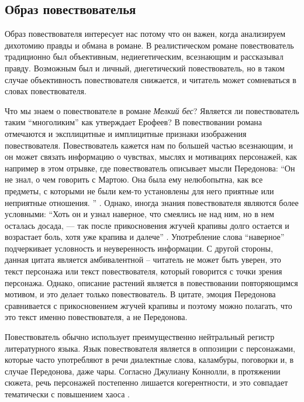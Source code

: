 \documentclass[12pt,a4paper]{article}
\begin{document}

\subsection{Образ повествователья}


Образ повествователя интересует нас потому что он важен, когда анализируем дихотомию правды и обмана в романе. В реалистическом романе повествователь традиционно был объективным, недиегетическим, всезнающим и рассказывал правду. Возможным был и личный, диегетический повествователь, но в таком случае объективность повествователя снижается, и читатель может сомневаться в словах повествователя.


Что мы знаем о повествователе в романе \emph{Мелкий бес}?
Является ли повествователь таким \enquote{многоликим} как утверждает Ерофеев? В повествовании романа отмечаются и эксплицитные и имплицитные признаки изображения повествователя. Повествователь кажется нам по большей частью всезнающим, и он может связать информацию о чувствах, мыслях и мотивациях персонажей, как например в этом отрывке, где повествователь описывает мысли Передонова:  \enquote{Он не знал, о чем говорить с Мартою. Она была ему нелюбопытна,
как все предметы, с которыми не были кем-то установлены для него
приятные или неприятные отношения.
} \parencite[18]{sologub2004}. Однако, иногда знания повествователя являются более условными: \enquote{Хоть он и узнал наверное, что смеялись не над ним, но в нем осталась досада, — так после прикосновения жгучей крапивы долго остается и  возрастает боль, хотя уже крапива и далече} \parencite[19]{sologub2004}. Употребление слова \enquote{наверное} подчеркивает условность и неуверенность информации. С другой стороны, данная цитата является амбивалентной – читатель не может быть уверен, это текст персонажа или текст повествователя, который говорится с точки зрения персонажа. Однако, описание растений является в повествовании повторяющимся мотивом, и это делает только повествователь. В цитате, эмоция Передонова сравнивается с прикосновением жгучей крапивы и поэтому можно полагать, что это текст именно повествователя, а не Передонова.

Повествователь обычно использует преимущественно нейтральный регистр литературного языка. Язык повествователя является в оппозиции с персонажами, которые часто употребляют в речи диалектные слова, каламбуры, поговорки и, в случае Передонова, даже чары. Согласно Джулиану Коннолли, в протяжении сюжета, речь персонажей постепенно лишается когерентности, и это совпадает тематически с повышением хаоса \parencite[358--359]{connolly1981}.
\end{document}
